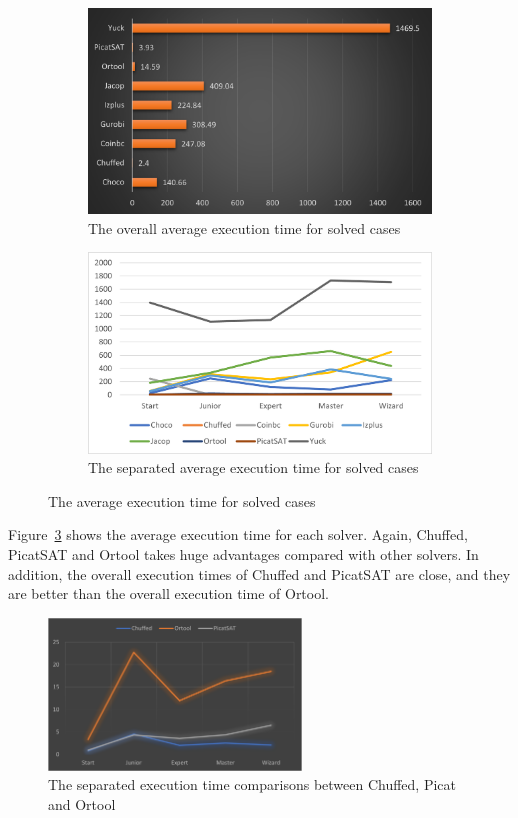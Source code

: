 \begin{figure}[htbp]
\centering
\begin{subfigure}{0.48\textwidth}
\includegraphics[width=\textwidth]{figs/averagetime.png}
\caption{The overall average execution time for solved cases}
\label{fig:averagetime1}
\end{subfigure}
\begin{subfigure}{0.48\textwidth}
\includegraphics[width=\textwidth]{figs/separated time.png}
\caption{The separated average execution time for solved cases}
\label{fig:averagetime2}
\end{subfigure}
\caption{The average execution time for solved cases}
\label{fig:averagetime}
\end{figure}
Figure~\ref{fig:averagetime} shows the average execution time for each solver. Again, Chuffed, PicatSAT and Ortool takes huge advantages compared with other solvers. In addition, the overall execution times of Chuffed and PicatSAT are close, and they are better than the overall execution time of Ortool. 
\begin{figure}[htbp]
\centering
\includegraphics[width=0.6\textwidth]{figs/Three comparison.png}
\caption{The separated execution time comparisons between Chuffed, Picat and Ortool}
\label{fig:3comparison}
\end{figure}
